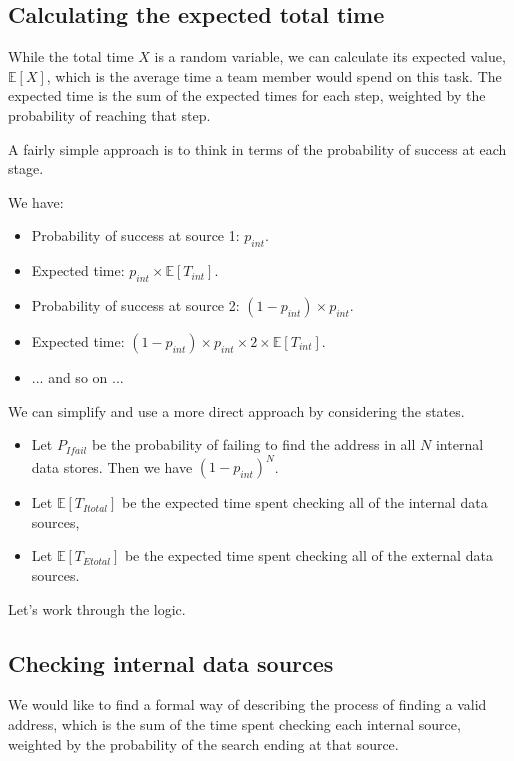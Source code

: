 \documentclass{article}
\begin{document}
\subsection{Calculating the expected total time}

While the total time $X$ is a random variable, we can calculate its expected value, $\mathbb{E}[X]$, which is the average time a team member would spend on this task. The expected time is the sum of the expected times for each step, weighted by the probability of reaching that step.

A fairly simple approach is to think in terms of the probability of success at each stage.

We have:

\begin{itemize}
    \item Probability of success at source 1: $p_{int}$. 
    \item Expected time: $p_{int} \times \mathbb{E}[T_{int}]$.
    \item Probability of success at source 2: $(1 - p_{int}) \times p_{int}$. 
    \item Expected time: $(1 - p_{int}) \times p_{int} \times 2 \times \mathbb{E}[T_{int}]$.  
    \item ... and so on ...
\end{itemize}

We can simplify and use a more direct approach by considering the states.

\begin{itemize}
    \item Let $P_{Ifail}$ be the probability of failing to find the address in all $N$ internal data stores. Then we have $\left( 1 - p_{int} \right)^{N}$.
    \item Let $\mathbb{E}\left[T_{Itotal} \right]$ be the expected time spent checking all of the internal data sources,
     \item Let $\mathbb{E}\left[T_{Etotal} \right]$ be the expected time spent checking all of the external data sources.
\end{itemize}

Let's work through the logic.

\subsection{Checking internal data sources}

We would like to find a formal way of describing the process of finding a valid address, which is the sum of the time spent checking each internal source, weighted by the probability of the search ending at that source.
\end{document}
